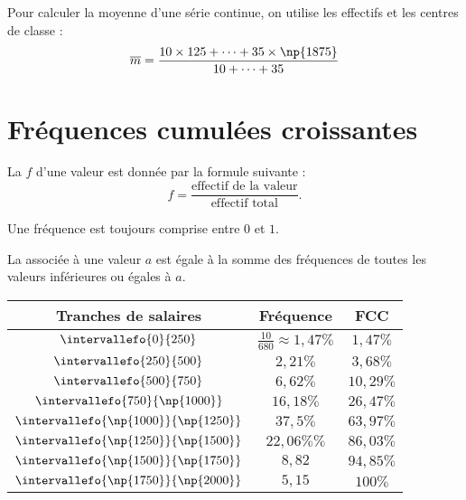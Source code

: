 \documentclass[10pt,openright,twoside,french]{book}
\begin{document}
\begin{Rmq}
    Pour calculer la moyenne d'une série continue, on utilise les effectifs et les centres de classe :
    \[\overline m = \dfrac{10 \times 125 + \cdots + 35 \times \np{1875}}{10 + \cdots + 35}\]
\end{Rmq}\clearpage

\section{Fréquences cumulées croissantes}

\begin{Defi}
    La  $f$ d'une valeur est donnée par la formule suivante : \[f = \frac{\text{effectif de la valeur}}{\text{effectif total}}.\]
\end{Defi}

\begin{Rmq}
    Une fréquence est toujours comprise entre $0$ et $1$.
\end{Rmq}

\begin{Defi}
    La  associée à une valeur $a$ est égale à la somme des fréquences de toutes les valeurs inférieures ou égales à $a$.
\end{Defi}

\begin{Exemple}
    \renewcommand\arraystretch{2.5}
        \begin{tabular}[t]{|c|c|c|}
            \hline
                Tranches de salaires & Fréquence & FCC \\
            \hline
                $\intervallefo{0}{250}$ & $\frac{10}{680} \approx 1,47\%$ & $1,47\%$\\
            \hline
                $\intervallefo{250}{500}$ & $2,21\%$ & $3,68\%$\\
            \hline
                $\intervallefo{500}{750}$ & $6,62\%$ & $10,29\%$\\
            \hline
                $\intervallefo{750}{\np{1000}}$ & $16,18\%$ & $26,47\%$\\
            \hline
                $\intervallefo{\np{1000}}{\np{1250}}$ & $37,5\%$ & $63,97\%$\\
            \hline
                $\intervallefo{\np{1250}}{\np{1500}}$ & $22,06\%\%$ & $86,03\%$\\
            \hline
                $\intervallefo{\np{1500}}{\np{1750}}$ & $8,82$ & $94,85\%$ \\
            \hline
                $\intervallefo{\np{1750}}{\np{2000}}$ & $5,15$ & $100\%$ \\
            \hline
        \end{tabular}
\end{Exemple}
\end{document}
